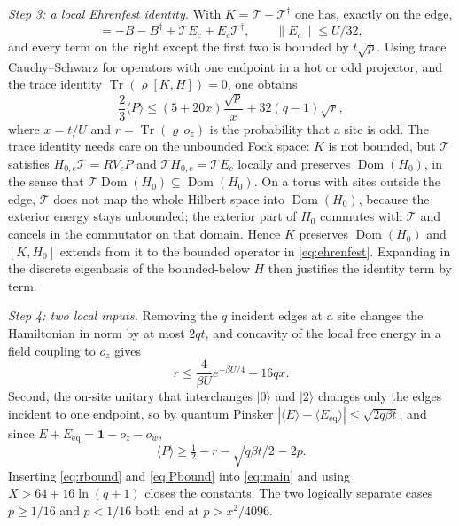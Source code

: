 \documentclass[11pt]{article}
\theoremstyle{definition}
\theoremstyle{remark}
\begin{document}
\emph{Step 3: a local Ehrenfest identity.} With $K=\mathcal T-\mathcal T^{\dagger}$
one has, exactly on the edge,
\begin{equation}
[K,H_{0}]=-B-B^{\dagger}+\mathcal T E_{c}+E_{c}\mathcal T^{\dagger},
\qquad \|E_{c}\|\le U/32,
\label{eq:ehrenfest}
\end{equation}
and every term on the right except the first two is bounded by $t\sqrt p$.
Using trace Cauchy--Schwarz for operators with one endpoint in a hot or odd
projector, and the trace identity $\operatorname{Tr}(\varrho[K,H])=0$, one
obtains
\begin{equation}
\frac23\langle P\rangle\le(5+20x)\frac{\sqrt p}{x}+32(q-1)\sqrt r ,
\label{eq:main}
\end{equation}
where $x=t/U$ and $r=\operatorname{Tr}(\varrho\,o_{z})$ is the probability that a
site is odd. The trace identity needs care on the unbounded Fock space: $K$ is not
bounded, but $\mathcal T$ satisfies $H_{0,e}\mathcal T=RV_{e}P$ and
$\mathcal T H_{0,e}=\mathcal T E_{c}$ locally and preserves
$\operatorname{Dom}(H_{0})$, in the sense that
$\mathcal T\operatorname{Dom}(H_{0})\subseteq\operatorname{Dom}(H_{0})$. On a
torus with sites outside the edge, $\mathcal T$ does not map the whole Hilbert
space into $\operatorname{Dom}(H_{0})$, because the exterior energy stays
unbounded; the exterior part of $H_{0}$ commutes with $\mathcal T$ and cancels in
the commutator on that domain. Hence $K$ preserves $\operatorname{Dom}(H_{0})$
and $[K,H_{0}]$ extends from it to the bounded operator in \eqref{eq:ehrenfest}.
Expanding in the discrete eigenbasis of the bounded-below $H$ then justifies the
identity term by term.

\emph{Step 4: two local inputs.} Removing the $q$ incident edges at a site changes
the Hamiltonian in norm by at most $2qt$, and concavity of the local free energy
in a field coupling to $o_{z}$ gives
\begin{equation}
r\le\frac{4}{\beta U}e^{-\beta U/4}+16qx .
\label{eq:rbound}
\end{equation}
Second, the on-site unitary that interchanges $|0\rangle$ and $|2\rangle$ changes
only the edges incident to one endpoint, so by quantum Pinsker
$|\langle E\rangle-\langle E_{\mathrm{eq}}\rangle|\le\sqrt{2q\beta t}$, and since
$E+E_{\mathrm{eq}}=\mathbf{1}-o_{z}-o_{w}$,
\begin{equation}
\langle P\rangle\ge\tfrac12-r-\sqrt{q\beta t/2}-2p .
\label{eq:Pbound}
\end{equation}
Inserting \eqref{eq:rbound} and \eqref{eq:Pbound} into \eqref{eq:main} and using
$X>64+16\ln(q+1)$ closes the constants. The two logically separate cases
$p\ge1/16$ and $p<1/16$ both end at $p>x^{2}/4096$.
\end{document}
